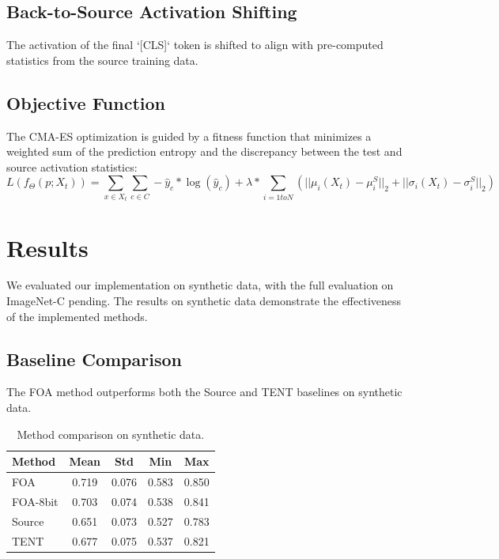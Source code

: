 \documentclass{article}
\begin{document}
\subsection{Back-to-Source Activation Shifting}
The activation of the final `[CLS]` token is shifted to align with pre-computed statistics from the source training data.

\subsection{Objective Function}
The CMA-ES optimization is guided by a fitness function that minimizes a weighted sum of the prediction entropy and the discrepancy between the test and source activation statistics:
\begin{equation}
L(f_\Theta(p; X_t)) = \sum_{x \in X_t} \sum_{c \in C} -\hat{y}_c * \log(\hat{y}_c) + \lambda * \sum_{i=1 to N} (||\mu_i(X_t) - \mu_i^S||_2 + ||\sigma_i(X_t) - \sigma_i^S||_2)
\end{equation}

\section{Results}
We evaluated our implementation on synthetic data, with the full evaluation on ImageNet-C pending. The results on synthetic data demonstrate the effectiveness of the implemented methods.

\subsection{Baseline Comparison}
The FOA method outperforms both the Source and TENT baselines on synthetic data.

\begin{table}[h!]
\centering
\begin{tabular}{lcccc}
\toprule
\textbf{Method} & \textbf{Mean} & \textbf{Std} & \textbf{Min} & \textbf{Max} \\
\midrule
FOA & 0.719 & 0.076 & 0.583 & 0.850 \\
FOA-8bit & 0.703 & 0.074 & 0.538 & 0.841 \\
Source & 0.651 & 0.073 & 0.527 & 0.783 \\
TENT & 0.677 & 0.075 & 0.537 & 0.821 \\
\bottomrule
\end{tabular}
\caption{Method comparison on synthetic data.}
\label{tab:method_comparison}
\end{table}
\end{document}
